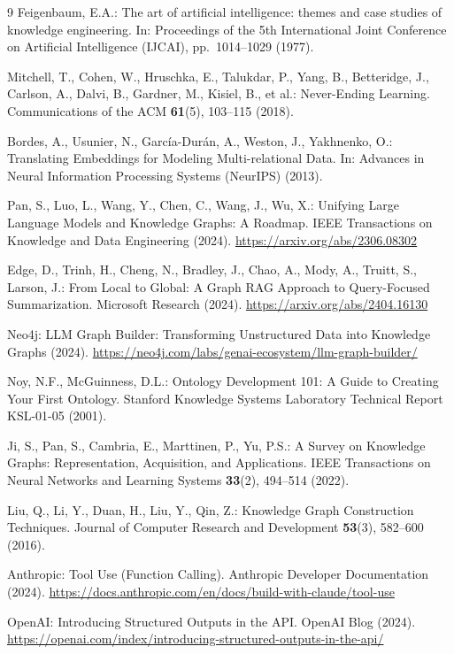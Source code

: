 \documentclass[11pt,a4paper]{article}
\begin{document}
\begin{thebibliography}{9}
Feigenbaum, E.A.: The art of artificial intelligence: themes and case studies of knowledge engineering. In: Proceedings of the 5th International Joint Conference on Artificial Intelligence (IJCAI), pp.~1014--1029 (1977).

Mitchell, T., Cohen, W., Hruschka, E., Talukdar, P., Yang, B., Betteridge, J., Carlson, A., Dalvi, B., Gardner, M., Kisiel, B., et al.: Never-Ending Learning. Communications of the ACM \textbf{61}(5), 103--115 (2018).

Bordes, A., Usunier, N., Garc\'ia-Dur\'an, A., Weston, J., Yakhnenko, O.: Translating Embeddings for Modeling Multi-relational Data. In: Advances in Neural Information Processing Systems (NeurIPS) (2013).

Pan, S., Luo, L., Wang, Y., Chen, C., Wang, J., Wu, X.: Unifying Large Language Models and Knowledge Graphs: A Roadmap. IEEE Transactions on Knowledge and Data Engineering (2024). \url{https://arxiv.org/abs/2306.08302}

Edge, D., Trinh, H., Cheng, N., Bradley, J., Chao, A., Mody, A., Truitt, S., Larson, J.: From Local to Global: A Graph RAG Approach to Query-Focused Summarization. Microsoft Research (2024). \url{https://arxiv.org/abs/2404.16130}

Neo4j: LLM Graph Builder: Transforming Unstructured Data into Knowledge Graphs (2024). \url{https://neo4j.com/labs/genai-ecosystem/llm-graph-builder/}

Noy, N.F., McGuinness, D.L.: Ontology Development 101: A Guide to Creating Your First Ontology. Stanford Knowledge Systems Laboratory Technical Report KSL-01-05 (2001).

Ji, S., Pan, S., Cambria, E., Marttinen, P., Yu, P.S.: A Survey on Knowledge Graphs: Representation, Acquisition, and Applications. IEEE Transactions on Neural Networks and Learning Systems \textbf{33}(2), 494--514 (2022).

Liu, Q., Li, Y., Duan, H., Liu, Y., Qin, Z.: Knowledge Graph Construction Techniques. Journal of Computer Research and Development \textbf{53}(3), 582--600 (2016).

Anthropic: Tool Use (Function Calling). Anthropic Developer Documentation (2024). \url{https://docs.anthropic.com/en/docs/build-with-claude/tool-use}

OpenAI: Introducing Structured Outputs in the API. OpenAI Blog (2024). \url{https://openai.com/index/introducing-structured-outputs-in-the-api/}
\end{thebibliography}
\end{document}

